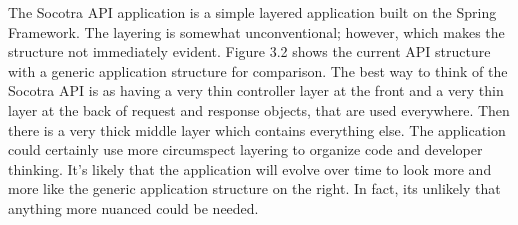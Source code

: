 The Socotra API application is a simple layered application built on the Spring Framework. The
layering is somewhat unconventional; however, which makes the structure not immediately evident.
Figure 3.2 shows the current API structure with a generic application structure for comparison. The
best way to think of the Socotra API is as having a very thin controller layer at the front and a
very thin layer at the back of request and response objects, that are used everywhere. Then
there is a very thick middle layer which contains everything else. The application could certainly use
more circumspect layering to organize code and developer thinking. It's likely that the application
will evolve over time to look more and more like the generic application structure on the right.
In fact, its unlikely that anything more nuanced could be needed.




